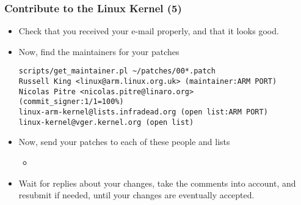 \begin{frame}[fragile]
  \frametitle{Contribute to the Linux Kernel (5)}
  \begin{itemize}
  \item Check that you received your e-mail properly, and that it
    looks good.
  \item Now, find the maintainers for your patches
{\scriptsize
\begin{verbatim}
scripts/get_maintainer.pl ~/patches/00*.patch
Russell King <linux@arm.linux.org.uk> (maintainer:ARM PORT)
Nicolas Pitre <nicolas.pitre@linaro.org>
(commit_signer:1/1=100%)
linux-arm-kernel@lists.infradead.org (open list:ARM PORT)
linux-kernel@vger.kernel.org (open list)
\end{verbatim}
}
  \item Now, send your patches to each of these people and lists
    \begin{itemize}
    \item {}
    \end{itemize}
  \item Wait for replies about your changes, take the comments into
    account, and resubmit if needed, until your changes are eventually
    accepted.
  \end{itemize}
\end{frame}

